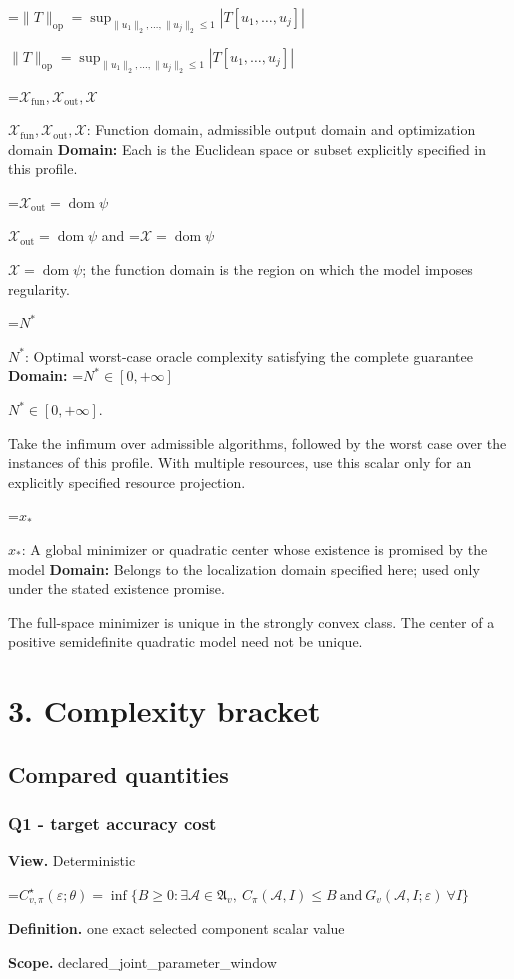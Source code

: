 \documentclass[10pt,a4paper]{article}
\newcommand{\AtlasMath}[1]{\par\begingroup\centering\setbox0=\hbox{$\displaystyle #1$}\ifdim\wd0>1.4\linewidth\typeout{ATLAS WIDE FORMULA: \the\wd0}\fi\ifdim\wd0>\linewidth\resizebox{\linewidth}{!}{\box0}\else\box0\fi\par\endgroup}
\newcommand{\AtlasInlineMath}[1]{\begingroup\setbox0=\hbox{$#1$}\ifdim\wd0>.4\linewidth\endgroup\AtlasMath{#1}\else\endgroup$#1$\fi}
\begin{document}
\AtlasInlineMath{\|T\|_{\mathrm{op}}=\sup_{\|u_1\|_2,\ldots,\|u_j\|_2\le1}|T[u_1,\ldots,u_j]|}

\AtlasInlineMath{\mathcal{X}_{\mathrm{fun}},\mathcal{X}_{\mathrm{out}},\mathcal{X}}: Function domain, admissible output domain and optimization domain \textbf{Domain:} Each is the Euclidean space or subset explicitly specified in this profile.

\AtlasInlineMath{\mathcal{X}_{\mathrm{out}}=\operatorname{dom}\psi} and \AtlasInlineMath{\mathcal{X}=\operatorname{dom}\psi}; the function domain is the region on which the model imposes regularity.

\AtlasInlineMath{N^*}: Optimal worst-case oracle complexity satisfying the complete guarantee \textbf{Domain:} \AtlasInlineMath{N^*\in[0,+\infty]}.

Take the infimum over admissible algorithms, followed by the worst case over the instances of this profile. With multiple resources, use this scalar only for an explicitly specified resource projection.

\AtlasInlineMath{x_*}: A global minimizer or quadratic center whose existence is promised by the model \textbf{Domain:} Belongs to the localization domain specified here; used only under the stated existence promise.

The full-space minimizer is unique in the strongly convex class. The center of a positive semidefinite quadratic model need not be unique.

\section{3. Complexity bracket}
\subsection{Compared quantities}
\subsubsection{Q1 - target accuracy cost}
\textbf{View.} Deterministic

\AtlasMath{C^\star_{v,\pi}(\varepsilon;\theta)=\inf\{B\ge0:\exists\mathcal A\in\mathfrak A_v,\ C_\pi(\mathcal A,I)\le B\ \text{and}\ G_v(\mathcal A,I;\varepsilon)\ \forall I\}}
\textbf{Definition.} one exact selected component scalar value

\textbf{Scope.} declared\_joint\_parameter\_window
\end{document}
